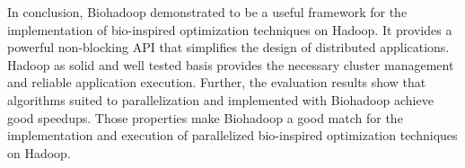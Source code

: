 In conclusion, Biohadoop demonstrated to be a useful framework for the implementation of bio-inspired optimization techniques on Hadoop. It provides a powerful non-blocking API that simplifies the design of distributed applications. Hadoop as solid and well tested basis provides the necessary cluster management and reliable application execution. Further, the evaluation results show that algorithms suited to parallelization and implemented with Biohadoop achieve good speedups. Those properties make Biohadoop a good match for the implementation and execution of parallelized bio-inspired optimization techniques on Hadoop.
% 
% 
% 
% 
% 
% 
% 
% 
% 
% 
% 
% 
